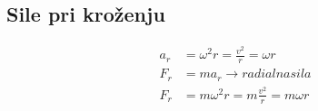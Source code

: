 {\color{indiagreen}\subsection{Sile pri kroženju}}
\begin{align*}
	a_r &= \omega^2r = \frac{v^2}{r} = \omega r\\
	F_r &= ma_r \rightarrow radialna sila\\
	F_r &= m\omega^2r = m\frac{v^2}{r} = m\omega r
\end{align*}
